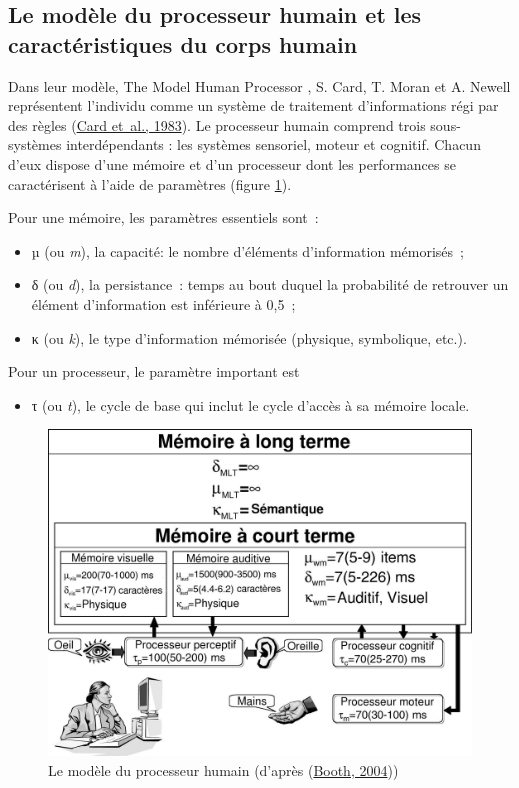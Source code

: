 \documentclass[
]{book}
\providecommand{\tightlist}{%
  \setlength{\itemsep}{0pt}\setlength{\parskip}{0pt}}
\begin{document}
\hypertarget{processeur}{%
\subsection{Le modèle du processeur humain et les caractéristiques du corps humain}\label{processeur}}

Dans leur modèle, The Model Human Processor , S. Card, T. Moran et A.
Newell représentent l'individu comme un système de traitement d'informations
régi par des règles (\href{047-bibliographie.html\#Card1983}{Card et~al.,
1983}). Le processeur humain comprend trois sous-systèmes interdépendants
: les systèmes sensoriel, moteur et cognitif. Chacun d'eux dispose d'une
mémoire et d'un processeur dont les performances se caractérisent à l'aide de
paramètres (figure \ref{fig:processorhumain}).

Pour une mémoire, les paramètres essentiels sont~:

\begin{itemize}
\tightlist
\item
  µ (ou \emph{m}), la capacité:
  le nombre d'éléments d'information mémorisés~;
\item
  δ (ou \emph{d}), la
  persistance~: temps au bout duquel la probabilité de retrouver un élément
  d'information est inférieure à 0,5~;
\item
  κ (ou \emph{k}), le type
  d'information mémorisée (physique, symbolique, etc.).
\end{itemize}

Pour un processeur, le paramètre important est

\begin{itemize}
\tightlist
\item
  τ (ou \emph{t}), le cycle de
  base qui inclut le cycle d'accès à sa mémoire locale.
\end{itemize}

\begin{figure}
\centering
\includegraphics{img/humanProcessor.png}
\caption{\label{fig:processorhumain}Le modèle du processeur humain (d'après
(\protect\hyperlink{ref-booth2004human}{Booth, 2004}))}
\end{figure}
\end{document}
